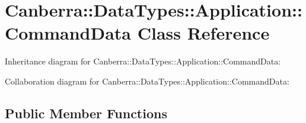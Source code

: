 \hypertarget{class_canberra_1_1_data_types_1_1_application_1_1_command_data}{}\section{Canberra\+:\+:Data\+Types\+:\+:Application\+:\+:Command\+Data Class Reference}
\label{class_canberra_1_1_data_types_1_1_application_1_1_command_data}


Inheritance diagram for Canberra\+:\+:Data\+Types\+:\+:Application\+:\+:Command\+Data\+:


Collaboration diagram for Canberra\+:\+:Data\+Types\+:\+:Application\+:\+:Command\+Data\+:
\subsection*{Public Member Functions}
